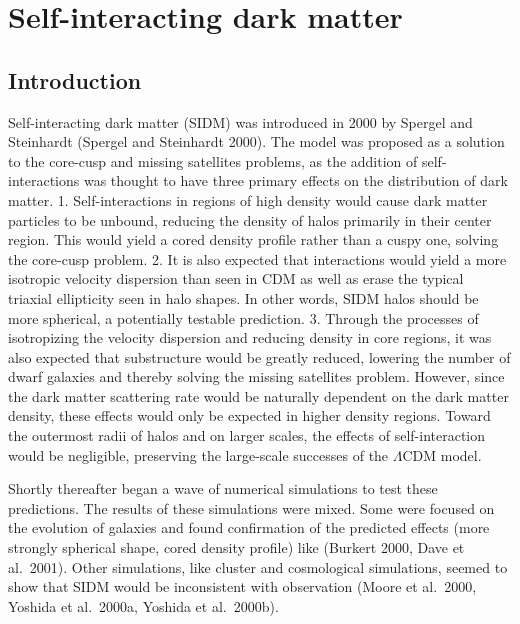 \hypertarget{self-interacting-dark-matter}{%
\chapter{Self-interacting dark
matter}\label{self-interacting-dark-matter}}

\hypertarget{introduction}{%
\section{Introduction}\label{introduction}}

Self-interacting dark matter (SIDM) was introduced in 2000 by Spergel
and Steinhardt (Spergel and Steinhardt 2000). The model was proposed as
a solution to the core-cusp and missing satellites problems, as the
addition of self-interactions was thought to have three primary effects
on the distribution of dark matter. 1. Self-interactions in regions of
high density would cause dark matter particles to be unbound, reducing
the density of halos primarily in their center region. This would yield
a cored density profile rather than a cuspy one, solving the core-cusp
problem. 2. It is also expected that interactions would yield a more
isotropic velocity dispersion than seen in CDM as well as erase the
typical triaxial ellipticity seen in halo shapes. In other words, SIDM
halos should be more spherical, a potentially testable prediction. 3.
Through the processes of isotropizing the velocity dispersion and
reducing density in core regions, it was also expected that substructure
would be greatly reduced, lowering the number of dwarf galaxies and
thereby solving the missing satellites problem. However, since the dark
matter scattering rate would be naturally dependent on the dark matter
density, these effects would only be expected in higher density regions.
Toward the outermost radii of halos and on larger scales, the effects of
self-interaction would be negligible, preserving the large-scale
successes of the \(\Lambda\)CDM model.

Shortly thereafter began a wave of numerical simulations to test these
predictions. The results of these simulations were mixed. Some were
focused on the evolution of galaxies and found confirmation of the
predicted effects (more strongly spherical shape, cored density profile)
like (Burkert 2000, Dave et al.~2001). Other simulations, like cluster
and cosmological simulations, seemed to show that SIDM would be
inconsistent with observation (Moore et al.~2000, Yoshida et al.~2000a,
Yoshida et al.~2000b).

